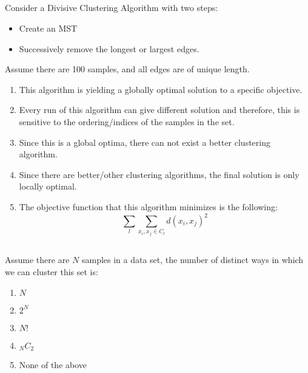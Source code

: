 \begin{frame}
\section{}
Consider a Divisive Clustering Algorithm with two steps:
\begin{itemize}
\item Create an MST
\item Successively remove the longest or largest edges.
\end{itemize}
Assume there are 100 samples, and all edges are of unique length.


\begin{enumerate}[label=(\Alph*)]
\item This algorithm is yielding a globally optimal solution to a specific objective.    %
\item Every run of this algorithm can give different solution and therefore, this is sensitive to the ordering/indices of the samples in the set.
\item Since this is a global optima, there can not exist a better clustering algorithm.
\item Since there are better/other clustering algorithms, the final solution is only locally optimal.
\item The objective function that this algorithm minimizes is the following: \[ \sum_{l} \sum_{x_i, x_j \in C_l} d(x_i, x_j)^2 \]    %
\end{enumerate}
\end{frame}


\begin{frame}
\section{}
Assume there are $N$ samples in a data set, the number of distinct ways in which we can cluster this set is:

\begin{enumerate}[label=(\Alph*)]
\item $N$
\item $2^N$
\item $N!$
\item $_NC_2$
\item None of the above  %
\end{enumerate}
\end{frame}

